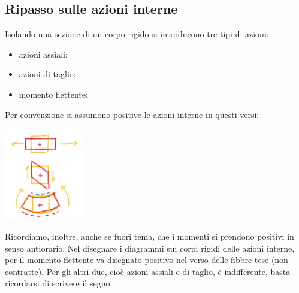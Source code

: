 \subsection{Ripasso sulle azioni interne}
Isolando una sezione di un corpo rigido si introducono tre tipi di azioni:
\begin{itemize}
    \item azioni assiali;
    \item azioni di taglio;
    \item momento flettente;
\end{itemize}
Per convenzione si assumono positive le azioni interne in questi versi:
\begin{center}
    \includegraphics[height=4cm]{../esercitazione5/img1.JPG}
\end{center}
Ricordiamo, inoltre, anche se fuori tema, che i momenti si prendono positivi in senso antiorario.
\newline
\newline
Nel disegnare i diagrammi sui corpi rigidi delle azioni interne, per il momento flettente va disegnato positivo nel verso delle fibbre tese (non contratte). Per gli altri due, cioè azioni assiali e di taglio, è indifferente, basta ricordarsi di scrivere il segno.
